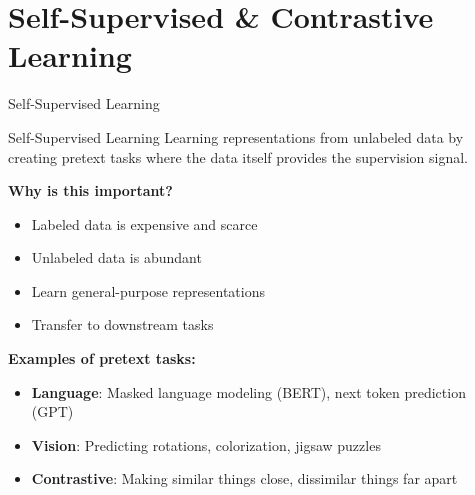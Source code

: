 \documentclass[aspectratio=169]{beamer}
\begin{document}
\section{Self-Supervised \& Contrastive Learning}

\begin{frame}[shrink=10]{Self-Supervised Learning 🔄}
\small
\begin{block}{Self-Supervised Learning}
Learning representations from unlabeled data by creating pretext tasks where the data itself provides the supervision signal.
\end{block}

\vspace{1em}

\textbf{Why is this important?}
\begin{itemize}\setlength{\itemsep}{0pt}
    \item Labeled data is expensive and scarce
    \item Unlabeled data is abundant
    \item Learn general-purpose representations
    \item Transfer to downstream tasks
\end{itemize}

\vspace{1em}

\textbf{Examples of pretext tasks:}
\begin{itemize}\setlength{\itemsep}{0pt}
    \item \textbf{Language}: Masked language modeling (BERT), next token prediction (GPT)
    \item \textbf{Vision}: Predicting rotations, colorization, jigsaw puzzles
    \item \textbf{Contrastive}: Making similar things close, dissimilar things far apart
\end{itemize}
\end{frame}
\end{document}
